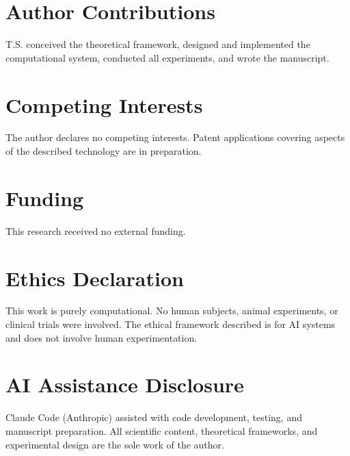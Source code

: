 \documentclass[11pt,letterpaper]{article}
\begin{document}

\section*{Author Contributions}
T.S. conceived the theoretical framework, designed and implemented the computational system, conducted all experiments, and wrote the manuscript.

\section*{Competing Interests}
The author declares no competing interests. Patent applications covering aspects of the described technology are in preparation.

\section*{Funding}
This research received no external funding.

\section*{Ethics Declaration}
This work is purely computational. No human subjects, animal experiments, or clinical trials were involved. The ethical framework described is for AI systems and does not involve human experimentation.

\section*{AI Assistance Disclosure}
Claude Code (Anthropic) assisted with code development, testing, and manuscript preparation. All scientific content, theoretical frameworks, and experimental design are the sole work of the author.



\end{document}
